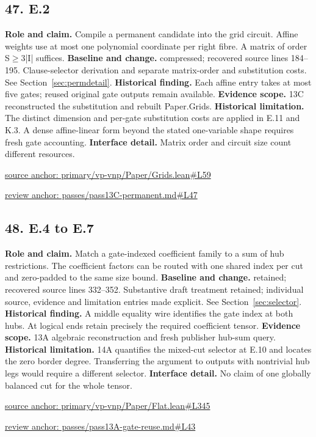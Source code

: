 \documentclass[11pt,letterpaper]{article}
\theoremstyle{definition}\newtheorem{definition}[theorem]{Definition}\newtheorem{example}[theorem]{Example}
\theoremstyle{remark}\newtheorem{remark}[theorem]{Remark}
\begin{document}
\subsection*{47. E.2}
\textbf{Role and claim.} Compile a permanent candidate into the grid circuit. Affine weights use at most one polynomial coordinate per right fibre. A matrix of order S\ensuremath{\ge}3|I| suffices.
\textbf{Baseline and change.} compressed; recovered source lines 184--195. Clause-selector derivation and separate matrix-order and substitution costs. See Section~\ref{sec:permdetail}.
\textbf{Historical finding.} Each affine entry takes at most five gates; reused original gate outputs remain available.
\textbf{Evidence scope.} 13C reconstructed the substitution and rebuilt Paper.Grids.
\textbf{Historical limitation.} The distinct dimension and per-gate substitution costs are applied in E.11 and K.3. A dense affine-linear form beyond the stated one-variable shape requires fresh gate accounting.
\textbf{Interface detail.} Matrix order and circuit size count different resources.
\par\href{https://github.com/nousentllc/VP-VNP-Review/blob/8a7976933b6b2b4ffda1ad3a0dfb5fc6b6f023e8/primary/vp-vnp/Paper/Grids.lean\#L59}{source anchor: primary/vp-vnp/Paper/Grids.lean\#L59}
\par\href{https://github.com/nousentllc/VP-VNP-Review/blob/8a7976933b6b2b4ffda1ad3a0dfb5fc6b6f023e8/passes/pass13C-permanent.md\#L47}{review anchor: passes/pass13C-permanent.md\#L47}
\goodbreak
\subsection*{48. E.4 to E.7}
\textbf{Role and claim.} Match a gate-indexed coefficient family to a sum of hub restrictions. The coefficient factors can be routed with one shared index per cut and zero-padded to the same size bound.
\textbf{Baseline and change.} retained; recovered source lines 332--352. Substantive draft treatment retained; individual source, evidence and limitation entries made explicit. See Section~\ref{sec:selector}.
\textbf{Historical finding.} A middle equality wire identifies the gate index at both hubs. At logical ends retain precisely the required coefficient tensor.
\textbf{Evidence scope.} 13A algebraic reconstruction and fresh publisher hub-sum query.
\textbf{Historical limitation.} 14A quantifies the mixed-cut selector at E.10 and locates the zero border degree. Transferring the argument to outputs with nontrivial hub legs would require a different selector.
\textbf{Interface detail.} No claim of one globally balanced cut for the whole tensor.
\par\href{https://github.com/nousentllc/VP-VNP-Review/blob/8a7976933b6b2b4ffda1ad3a0dfb5fc6b6f023e8/primary/vp-vnp/Paper/Flat.lean\#L345}{source anchor: primary/vp-vnp/Paper/Flat.lean\#L345}
\par\href{https://github.com/nousentllc/VP-VNP-Review/blob/8a7976933b6b2b4ffda1ad3a0dfb5fc6b6f023e8/passes/pass13A-gate-reuse.md\#L43}{review anchor: passes/pass13A-gate-reuse.md\#L43}
\goodbreak
\end{document}
